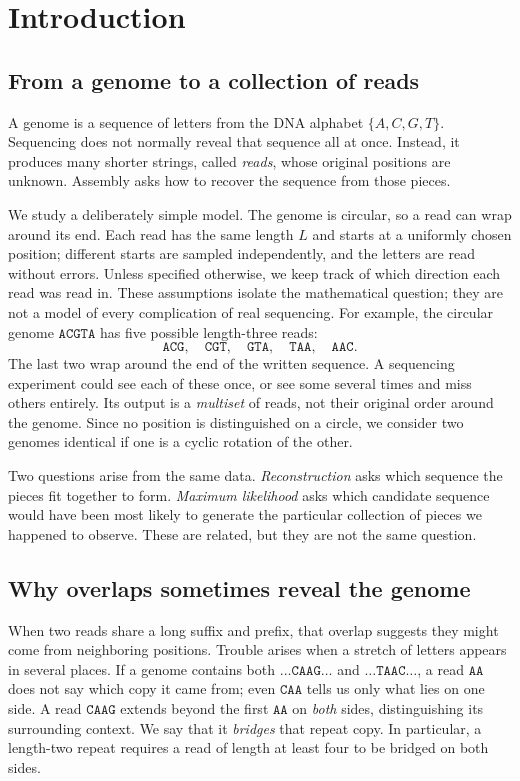 \section{Introduction}
\label{sec:intro}

\subsection{From a genome to a collection of reads}

A genome is a sequence of letters from the DNA alphabet $\{A,C,G,T\}$.
Sequencing does not normally reveal that sequence all at once. Instead, it
produces many shorter strings, called \emph{reads}, whose original positions
are unknown. Assembly asks how to recover the sequence from those pieces.

We study a deliberately simple model. The genome is circular, so a read can
wrap around its end. Each read has the same length $L$ and starts at a
uniformly chosen position; different starts are sampled independently, and
the letters are read without errors. Unless specified otherwise, we keep
track of which direction each read was read in. These assumptions isolate
the mathematical question; they are not a model of every complication of
real sequencing.
For example, the circular genome $\texttt{ACGTA}$ has five possible
length-three reads:
\[
  \texttt{ACG},\quad\texttt{CGT},\quad\texttt{GTA},\quad
  \texttt{TAA},\quad\texttt{AAC}.
\]
The last two wrap around the end of the written sequence. A sequencing
experiment could see each of these once, or see some several times and miss
others entirely. Its output is a \emph{multiset} of reads, not their original
order around the genome. Since no position is distinguished on a circle,
we consider two genomes identical if one is a cyclic rotation of the other.

Two questions arise from the same data. \emph{Reconstruction} asks which
sequence the pieces fit together to form. \emph{Maximum likelihood} asks
which candidate sequence would have been most likely to generate the
particular collection of pieces we happened to observe. These are related,
but they are not the same question.

\subsection{Why overlaps sometimes reveal the genome}

When two reads share a long suffix and prefix, that overlap suggests they
might come from neighboring positions. Trouble arises when a stretch of
letters appears in several places. If a genome contains both
$\texttt{\ldots CAAG\ldots}$ and $\texttt{\ldots TAAC\ldots}$,
a read $\texttt{AA}$ does not say which copy it came from; even
$\texttt{CAA}$ tells us only what lies on one side. A read
$\texttt{CAAG}$ extends beyond the first $\texttt{AA}$ on \emph{both}
sides, distinguishing its surrounding context. We say that it
\emph{bridges} that repeat copy. In particular, a length-two repeat
requires a read of length at least four to be bridged on both sides.

